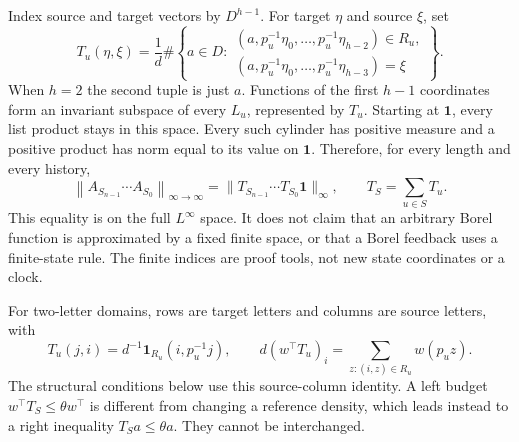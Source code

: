 \documentclass[11pt,reqno]{amsart}
\numberwithin{equation}{section}
\theoremstyle{definition}
\newcommand{\one}{\mathbf 1}
\newcommand{\opnorm}[1]{\left\|#1\right\|_{\infty\to\infty}}
\begin{document}
Index source and target vectors by $D^{h-1}$. For target $\eta$
and source $\xi$, set
\begin{equation}\label{eq:cyl-matrix}
 T_u(\eta,\xi)=\frac1d\#\left\{a\in D:
 \begin{array}{l}
 (a,p_u^{-1}\eta_0,\ldots,p_u^{-1}\eta_{h-2})\in R_u,\\
 (a,p_u^{-1}\eta_0,\ldots,p_u^{-1}\eta_{h-3})=\xi
 \end{array}\right\}.
\end{equation}
When $h=2$ the second tuple is just $a$.
Functions of the first $h-1$ coordinates form an invariant subspace
of every $L_u$, represented by $T_u$. Starting at $\one$, every
list product stays in this space. Every such cylinder has positive
measure and a positive product has norm equal to its value on $\one$.
Therefore, for every length and every history,
\begin{equation}\label{eq:cyl-fullnorm}
 \opnorm{A_{S_{n-1}}\cdots A_{S_0}}
 =\|T_{S_{n-1}}\cdots T_{S_0}\one\|_\infty,
 \qquad T_S=\sum_{u\in S}T_u.
\end{equation}
This equality is on the full $L^\infty$ space. It does not claim
that an arbitrary Borel function is approximated by a fixed finite
space, or that a Borel feedback uses a finite-state rule. The finite
indices are proof tools, not new state coordinates or a clock.

For two-letter domains, rows are target letters and columns are
source letters, with
\begin{equation}\label{eq:cyl-two}
 T_u(j,i)=d^{-1}\one_{R_u}(i,p_u^{-1}j),\qquad
 d(w^\top T_u)_i=\sum_{z:(i,z)\in R_u}w(p_uz).
\end{equation}
The structural conditions below use this source-column identity.
A left budget $w^\top T_S\le\theta w^\top$ is different from
changing a reference density, which leads instead to a right
inequality $T_Sa\le\theta a$. They cannot be interchanged.
\end{document}

